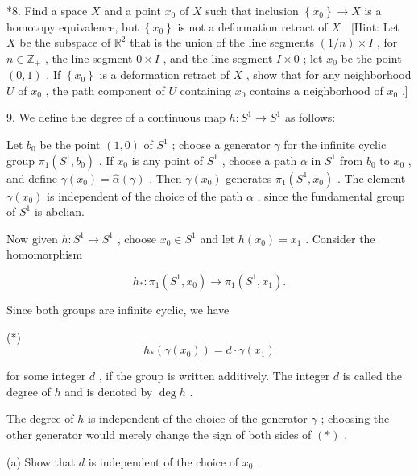 \documentclass[10pt]{article}
\begin{document}
*8. Find a space \(X\) and a point \({x}_{0}\) of \(X\) such that inclusion \(\left\{  {x}_{0}\right\}   \rightarrow  X\) is a homotopy equivalence, but \(\left\{  {x}_{0}\right\}\) is not a deformation retract of \(X\) . [Hint: Let \(X\) be the subspace of \({\mathbb{R}}^{2}\) that is the union of the line segments \(\left( {1/n}\right)  \times  I\) , for \(n \in  {\mathbb{Z}}_{ + }\) , the line segment \(0 \times  I\) , and the line segment \(I \times  0\) ; let \({x}_{0}\) be the point \(\left( {0,1}\right)\) . If \(\left\{  {x}_{0}\right\}\) is a deformation retract of \(X\) , show that for any neighborhood \(U\) of \({x}_{0}\) , the path component of \(U\) containing \({x}_{0}\) contains a neighborhood of \({x}_{0}\) .]

9. We define the degree of a continuous map \(h : {S}^{1} \rightarrow  {S}^{1}\) as follows:

Let \({b}_{0}\) be the point \(\left( {1,0}\right)\) of \({S}^{1}\) ; choose a generator \(\gamma\) for the infinite cyclic group \({\pi }_{1}\left( {{S}^{1},{b}_{0}}\right)\) . If \({x}_{0}\) is any point of \({S}^{1}\) , choose a path \(\alpha\) in \({S}^{1}\) from \({b}_{0}\) to \({x}_{0}\) , and define \(\gamma \left( {x}_{0}\right)  = \widehat{\alpha }\left( \gamma \right)\) . Then \(\gamma \left( {x}_{0}\right)\) generates \({\pi }_{1}\left( {{S}^{1},{x}_{0}}\right)\) . The element \(\gamma \left( {x}_{0}\right)\) is independent of the choice of the path \(\alpha\) , since the fundamental group of \({S}^{1}\) is abelian.

Now given \(h : {S}^{1} \rightarrow  {S}^{1}\) , choose \({x}_{0} \in  {S}^{1}\) and let \(h\left( {x}_{0}\right)  = {x}_{1}\) . Consider the homomorphism

\[
{h}_{ * } : {\pi }_{1}\left( {{S}^{1},{x}_{0}}\right)  \rightarrow  {\pi }_{1}\left( {{S}^{1},{x}_{1}}\right) .
\]

Since both groups are infinite cyclic, we have

(*)
\[
{h}_{ * }\left( {\gamma \left( {x}_{0}\right) }\right)  = d \cdot  \gamma \left( {x}_{1}\right)
\]

for some integer \(d\) , if the group is written additively. The integer \(d\) is called the degree of \(h\) and is denoted by \(\deg h\) .

The degree of \(h\) is independent of the choice of the generator \(\gamma\) ; choosing the other generator would merely change the sign of both sides of \(\left( *\right)\) .

(a) Show that \(d\) is independent of the choice of \({x}_{0}\) .
\end{document}
